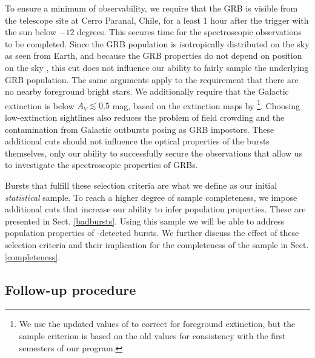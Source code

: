 \documentclass[longauth]{aa}    %
\begin{document}
To ensure a minimum of observability, we require that the GRB is visible from
the telescope site at Cerro Paranal, Chile, for a least 1 hour after the trigger
with the sun below $-12$ degrees. This secures time for the spectroscopic
observations to be completed. Since the GRB population is isotropically
distributed on the sky as seen from Earth, and because the GRB properties do not
depend on position on the sky \citep{Meegan1992, Briggs1996, Ukwatta2016}, this
cut does not influence our ability to fairly sample the underlying GRB
population. The same arguments apply to the requirement that there are no nearby
foreground bright stars. We additionally require that the Galactic extinction is
below $A_V \lesssim 0.5$ mag, based on the extinction maps by
\citet{Schlegel1998}\footnote{We use the updated values of \citet{Schlafly2011}
	to correct for foreground extinction, but the sample criterion is based on the
	old \citet{Schlegel1998} values for consistency with the first semesters of our
	program.}. Choosing low-extinction sightlines also reduces the problem of field
crowding and the contamination from Galactic outbursts posing as GRB impostors.
These additional cuts should not influence the optical properties of the bursts
themselves, only our ability to successfully secure the observations that allow
us to investigate the spectroscopic properties of GRBs.

Bursts that fulfill these selection criteria are what we define as our initial
\textit{statistical} sample. To reach a higher degree of sample completeness, we
impose additional cuts that increase our ability to infer population properties.
These are presented in Sect. \ref{badbursts}. Using this sample we will be able
to address population properties of \swift-detected bursts. We further discuss
the effect of these selection criteria and their implication for the
completeness of the sample in Sect. \ref{completeness}.

\subsection{Follow-up procedure}
\end{document}
